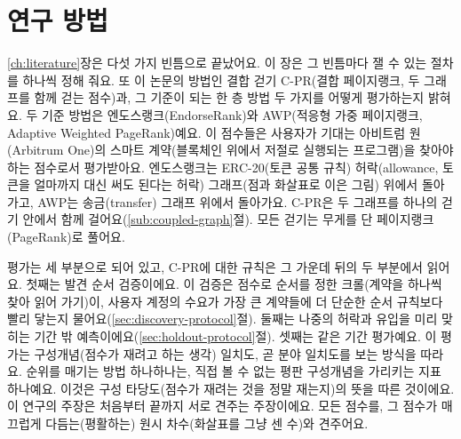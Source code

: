 \chapter{연구 방법}
\label{ch:methodology}

\ref{ch:literature}장은 다섯 가지 빈틈으로 끝났어요. 이 장은 그 빈틈마다 잴 수 있는 절차를 하나씩 정해 줘요. 또 이 논문의 방법인 결합 걷기 \mbox{C-PR}(결합 페이지랭크, 두 그래프를 함께 걷는 점수)과, 그 기준이 되는 한 층 방법 두 가지를 어떻게 평가하는지 밝혀요. 두 기준 방법은 엔도스랭크(EndorseRank)와 AWP(적응형 가중 페이지랭크, Adaptive Weighted PageRank)예요. 이 점수들은 사용자가 기대는 아비트럼 원(Arbitrum One)의 스마트 계약(블록체인 위에서 저절로 실행되는 프로그램)을 찾아야 하는 점수로서 평가받아요. 엔도스랭크는 ERC-20(토큰 공통 규칙) 허락(allowance, 토큰을 얼마까지 대신 써도 된다는 허락) 그래프(점과 화살표로 이은 그림) 위에서 돌아가고, AWP는 송금(transfer) 그래프 위에서 돌아가요\parencite{do2023awp}. \mbox{C-PR}은 두 그래프를 하나의 걷기 안에서 함께 걸어요(\ref{sub:coupled-graph}절). 모든 걷기는 무게를 단 페이지랭크(PageRank)로 풀어요\parencite{page1999pagerank}.

평가는 세 부분으로 되어 있고, \mbox{C-PR}에 대한 규칙은 그 가운데 뒤의 두 부분에서 읽어요. 첫째는 발견 순서 검증이에요. 이 검증은 점수로 순서를 정한 크롤(계약을 하나씩 찾아 읽어 가기)이, 사용자 계정의 수요가 가장 큰 계약들에 더 단순한 순서 규칙보다 빨리 닿는지 물어요(\ref{sec:discovery-protocol}절). 둘째는 나중의 허락과 유입을 미리 맞히는 기간 밖 예측이에요(\ref{sec:holdout-protocol}절). 셋째는 같은 기간 평가예요. 이 평가는 구성개념(점수가 재려고 하는 생각) 일치도, 곧 분야 일치도를 보는 방식을 따라요. 순위를 매기는 방법 하나하나는, 직접 볼 수 없는 평판 구성개념을 가리키는 지표 하나예요. 이것은 구성 타당도(점수가 재려는 것을 정말 재는지)의 뜻을 따른 것이에요\parencite{cronbach1955construct}. 이 연구의 주장은 처음부터 끝까지 서로 견주는 주장이에요. 모든 점수를, 그 점수가 매끄럽게 다듬는(평활하는) 원시 차수(화살표를 그냥 센 수)와 견주어요.

